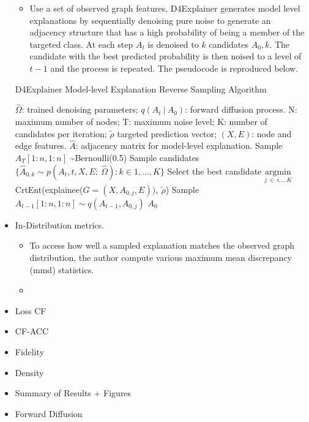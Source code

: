 \documentclass[
  11pt,
  letterpaper,
]{article}
\providecommand{\tightlist}{%
  \setlength{\itemsep}{0pt}\setlength{\parskip}{0pt}}\usepackage{longtable,booktabs,array}
\begin{document}
\begin{itemize}
  \begin{itemize}
  \tightlist
  \item
    Use a set of observed graph features, D4Explainer generates model
    level explanations by sequentially denoising pure noise to generate
    an adjacency structure that has a high probability of being a member
    of the targeted class. At each step \(A_t\) is denoised to \(k\)
    candidates \(A_0, k\). The candidate with the best predicted
    probability is then noised to a level of \(t-1\) and the process is
    repeated. The pseudocode is reproduced below.
  \end{itemize}

  \begin{algorithm}
    \caption{D4Explainer Model-level Explanation Reverse Sampling Algorithm}\label{alg:cap}
    \begin{algorithmic}
        \Require $\hat \Omega$: trained denoising parameters; 
                $q(A_t \ | \ A_0)$: forward diffusion process.
        \renewcommand{\algorithmicrequire}{\textbf{Input:}}
        \renewcommand{\algorithmicensure}{\textbf{Output:}}
        \Require N: maximum number of nodes; T: maximum noise level; 
                K: number of candidates per iteration; 
                $\tilde{\rho}$ targeted prediction vector; 
                $(X, E)$: node and edge features.  
        \Ensure $\hat A$: adjacency matrix for model-level explanation.
        \State Sample $A_T[1:n, 1:n]$ \sim Bernoulli(0.5)
            \State Sample candidates 
                $\{\hat A_{0, k} \sim p(A_t,t, X, E; \ \hat \Omega) : k \in 1, \dots, K\}$
            \State Select the best candidate 
            $\underset{j \ \in \ i, \dots K}{\text{argmin}}$ 
            CrtEnt(explainee($G = (X, A_{0, j}, E)), \ \tilde{\rho}$)
            \State Sample $A_{t-1}[1:n, 1:n] \sim q(A_{t-1}, A_{0, j})$
        \EndFor
        \State \Return $A_0$
    \end{algorithmic}
    \end{algorithm}
\item
  In-Distribution metrics.

  \begin{itemize}
  \item
    To access how well a sampled explanation matches the observed graph
    distribution, the author compute various maximum mean discrepancy
    (mmd) statistics.
  \item
  \end{itemize}
\item
  Loss CF
\item
  CF-ACC
\item
  Fidelity
\item
  Density
\item
  Summary of Results + Figures
\item
  Forward Diffusion


\end{itemize}
\end{document}
